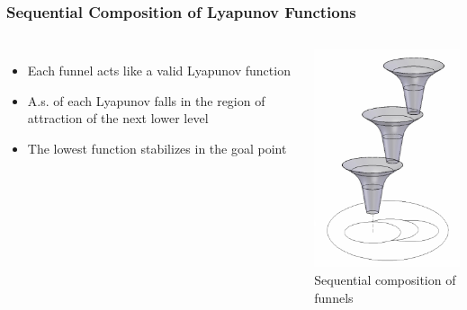 \documentclass{beamer}
\begin{document}
\begin{frame}
\frametitle{Sequential Composition of Lyapunov Functions}

\begin{columns}[c] 
\begin{itemize}
\item Each funnel acts like a valid Lyapunov function \vspace{0.2cm}
\item A.s. of each Lyapunov falls in the region of attraction of the next lower level \vspace{0.2cm}
\item The lowest function stabilizes in the goal point
\end{itemize}

\centering
 \includegraphics[width=.5\textwidth]{figures/SeqentialLyapunov_Funnels.png}\\
Sequential composition of funnels  \cite{p2}
\end{columns}

\end{frame}


\end{document}
